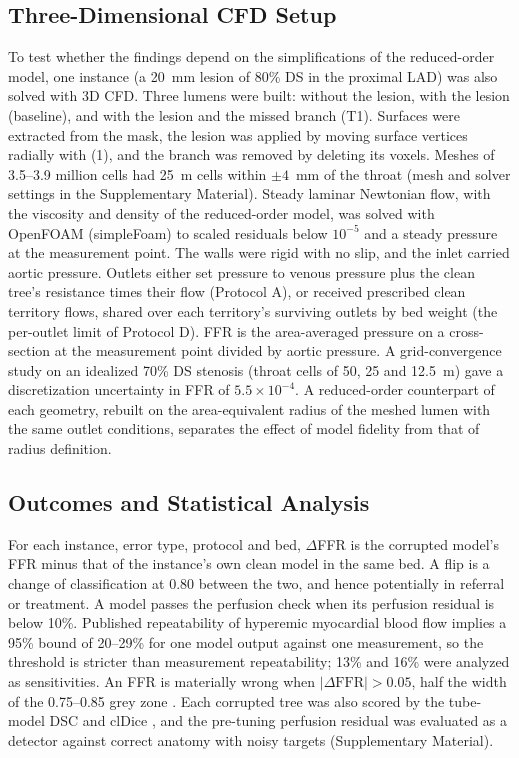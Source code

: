 \documentclass[journal,twoside,web]{ieeecolor}
\begin{document}
\subsection{Three-Dimensional CFD Setup}
To test whether the findings depend on the simplifications of the reduced-order model, one instance (a 20~mm lesion
of 80\% DS in the proximal LAD) was also solved with 3D CFD. Three lumens were built: without the lesion, with the lesion (baseline), and with the
lesion and the missed branch (T1). Surfaces were extracted from the mask, the
lesion was applied by moving surface vertices radially with (1), and the branch was removed by deleting its voxels.
Meshes of 3.5--3.9 million cells had 25~\textmu m cells within $\pm 4$~mm of the throat (mesh and solver settings in the Supplementary Material).
Steady laminar Newtonian flow, with the viscosity and density of the reduced-order model, was solved with OpenFOAM
(simpleFoam) to scaled residuals below $10^{-5}$ and a steady pressure at the measurement
point. The walls were rigid with no slip, and the inlet carried aortic pressure. Outlets either set pressure to venous pressure plus the clean tree's resistance times their flow (Protocol A), or received prescribed clean territory flows, shared over each territory's surviving outlets by bed weight (the per-outlet limit of Protocol D). FFR
is the area-averaged pressure on a cross-section at the measurement point divided by aortic pressure. A
grid-convergence study on an idealized 70\% DS stenosis (throat cells of 50, 25 and 12.5~\textmu m) gave a
discretization uncertainty in FFR of $5.5\times10^{-4}$. A reduced-order counterpart of each geometry, rebuilt on the
area-equivalent radius of the meshed lumen with the same outlet conditions, separates the effect of model fidelity
from that of radius definition.

\subsection{Outcomes and Statistical Analysis}
For each instance, error type, protocol and bed, $\Delta$FFR is the corrupted model's FFR minus that of the
instance's own clean model in the same bed. A flip is a change of classification at 0.80 between the two, and hence potentially
in referral or treatment. A model passes the perfusion check when its perfusion residual is below 10\%.
Published repeatability of hyperemic myocardial blood flow \cite{schindler2023,brown2018} implies a 95\% bound of
20--29\% for one model output against one measurement, so the threshold is stricter than measurement repeatability;
13\% and 16\% were analyzed as sensitivities. An FFR is materially wrong when $|\Delta\mathrm{FFR}| > 0.05$, half the width of the 0.75--0.85 grey zone
\cite{petraco2013}. Each corrupted tree was also scored by the tube-model DSC and clDice \cite{shit2021}, and the
pre-tuning perfusion residual was evaluated as a detector against correct anatomy with noisy targets
(Supplementary Material).
\end{document}
